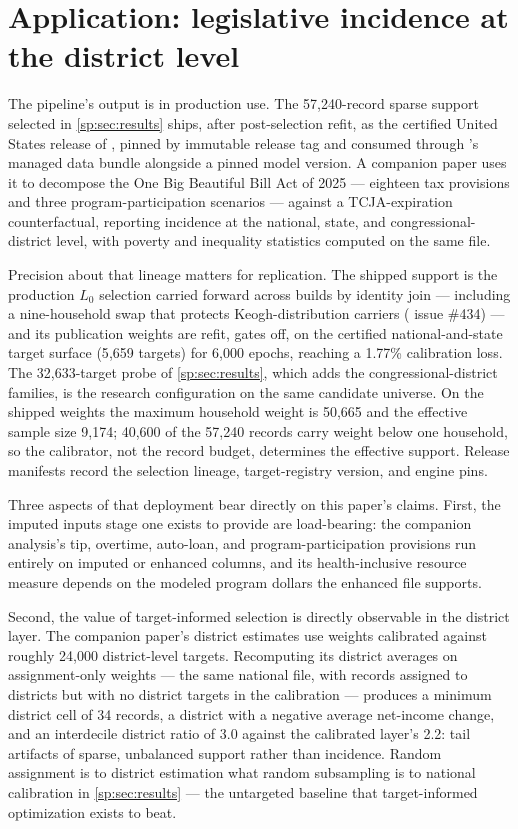\section{Application: legislative incidence at the district level}
\label{sec:application}

The pipeline's output is in production use. The 57{,}240-record sparse
support selected in \autoref{sp:sec:results} ships, after
post-selection refit, as the certified United States release of
\populace{}, pinned by immutable release tag and consumed through
\policyenginepy{}'s managed data bundle alongside a pinned
model version. A companion paper \citep{ghenis2026obbba} uses it to
decompose the One Big Beautiful Bill Act of 2025 --- eighteen tax
provisions and three program-participation scenarios --- against a
TCJA-expiration counterfactual, reporting incidence at the national,
state, and congressional-district level, with poverty and inequality
statistics computed on the same file.

Precision about that lineage matters for replication. The shipped
support is the production $L_0$ selection carried forward across
builds by identity join --- including a nine-household swap that
protects Keogh-distribution carriers (\populace{} issue \#434) ---
and its publication weights are refit, gates off, on the certified
national-and-state target surface (5{,}659 targets) for 6{,}000
epochs, reaching a 1.77\% calibration loss. The 32{,}633-target probe
of \autoref{sp:sec:results}, which adds the congressional-district
families, is the research configuration on the same candidate
universe. On the shipped weights the maximum household weight is
50{,}665 and the effective sample size 9{,}174; 40{,}600 of the
57{,}240 records carry weight below one household, so the calibrator,
not the record budget, determines the effective support. Release
manifests record the selection lineage, target-registry version, and
engine pins.

Three aspects of that deployment bear directly on this paper's
claims. First, the imputed inputs stage one exists to provide are
load-bearing: the companion analysis's tip, overtime, auto-loan, and
program-participation provisions run entirely on imputed or
enhanced columns, and its health-inclusive resource measure depends
on the modeled program dollars the enhanced file supports.

Second, the value of target-informed selection is directly
observable in the district layer. The companion paper's district
estimates use weights calibrated against roughly 24{,}000
district-level targets. Recomputing its district averages on
assignment-only weights --- the same national file, with records
assigned to districts but with no district targets in the
calibration --- produces a minimum district cell of 34 records, a
district with a negative average net-income change, and an
interdecile district ratio of 3.0 against the calibrated layer's
2.2: tail artifacts of sparse, unbalanced support rather than
incidence. Random assignment is to district estimation what random
subsampling is to national calibration in
\autoref{sp:sec:results} --- the untargeted baseline that
target-informed optimization exists to beat.

